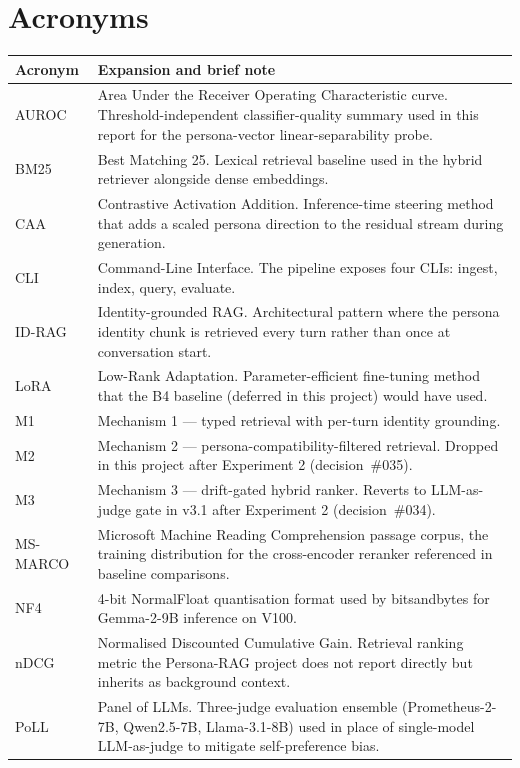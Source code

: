 \chapter*{Acronyms}

\begin{tabularx}{\textwidth}{l X}
  \toprule
  \textbf{Acronym} & \textbf{Expansion and brief note} \\
  \midrule
  AUROC & Area Under the Receiver Operating Characteristic curve. Threshold-independent classifier-quality summary used in this report for the persona-vector linear-separability probe. \\
  BM25 & Best Matching 25. Lexical retrieval baseline used in the hybrid retriever alongside dense embeddings. \\
  CAA & Contrastive Activation Addition. Inference-time steering method that adds a scaled persona direction to the residual stream during generation. \\
  CLI & Command-Line Interface. The pipeline exposes four CLIs: ingest, index, query, evaluate. \\
  ID-RAG & Identity-grounded RAG. Architectural pattern where the persona identity chunk is retrieved every turn rather than once at conversation start. \\
  LoRA & Low-Rank Adaptation. Parameter-efficient fine-tuning method that the B4 baseline (deferred in this project) would have used. \\
  M1 & Mechanism 1 — typed retrieval with per-turn identity grounding. \\
  M2 & Mechanism 2 — persona-compatibility-filtered retrieval. Dropped in this project after Experiment 2 (decision~\#035). \\
  M3 & Mechanism 3 — drift-gated hybrid ranker. Reverts to LLM-as-judge gate in v3.1 after Experiment 2 (decision~\#034). \\
  MS-MARCO & Microsoft Machine Reading Comprehension passage corpus, the training distribution for the cross-encoder reranker referenced in baseline comparisons. \\
  NF4 & 4-bit NormalFloat quantisation format used by bitsandbytes for Gemma-2-9B inference on V100. \\
  nDCG & Normalised Discounted Cumulative Gain. Retrieval ranking metric the Persona-RAG project does not report directly but inherits as background context. \\
  PoLL & Panel of LLMs. Three-judge evaluation ensemble (Prometheus-2-7B, Qwen2.5-7B, Llama-3.1-8B) used in place of single-model LLM-as-judge to mitigate self-preference bias. \\

\end{tabularx}
